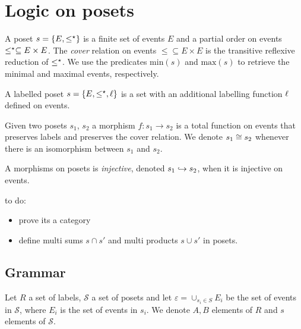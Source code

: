 \section{Logic on posets}

\begin{definition}[Poset]
  \label{def:poset}
  A poset $s=\{E,\leq^{\star}\}$ is a finite set of events $E$ and a partial order on events $\leq^{\star}\subseteq E\times E$. The \emph{cover} relation on events $\leq\subseteq E\times E$ is the transitive reflexive reduction of $\leq^{\star}$.
  We use the predicates $\text{min}(s)$ and $\text{max}(s)$ to retrieve the minimal and maximal events, respectively.

  A labelled poset $s=\{E,\leq^{\star},\ell\}$ is a set with an additional labelling function $\ell$ defined on events.
\end{definition}

\begin{definition}
  Given two posets $s_1$, $s_2$ a morphism $f:s_1\to s_2$ is a total function on events that preserves labels and preserves the cover relation. We denote $s_1\cong s_2$ whenever there is an isomorphism between $s_1$ and $s_2$.

  A morphisms on posets is \emph{injective}, denoted $s_1\hookrightarrow s_2$, when it is injective on events.
\end{definition}

\begin{mdframed}[backgroundcolor=blue!20]
  to do:
  \begin{itemize}
  \item prove its a category
  \item define multi sums $s\cap s'$ and multi products $s\cup s'$ in posets.
  \end{itemize}
\end{mdframed}

\subsection{Grammar}

Let $R$ a set of labels, $\mathcal{S}$ a set of posets and let $\varepsilon = \cup_{s_i\in S} E_i$ be the set of events in $\mathcal{S}$, where $E_i$ is the set of events in $s_i$.
We denote $A,B$ elements of $R$ and $s$ elements of $\mathcal{S}$.

